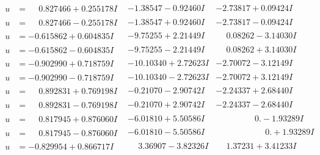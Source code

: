 \documentclass[1p]{elsarticle_modified}
\theoremstyle{definition}
\begin{document}
$$\begin{array}{c|c|c}
\begin{aligned}
u &= \phantom{-}0.827466 + 0.255178 I\end{aligned}
 & -1.38547 - 0.92460 I & -2.73817 + 0.09424 I \\ \hline\begin{aligned}
u &= \phantom{-}0.827466 - 0.255178 I\end{aligned}
 & -1.38547 + 0.92460 I & -2.73817 - 0.09424 I \\ \hline\begin{aligned}
u &= -0.615862 + 0.604835 I\end{aligned}
 & -9.75255 + 2.21449 I & \phantom{-}0.08262 - 3.14030 I \\ \hline\begin{aligned}
u &= -0.615862 - 0.604835 I\end{aligned}
 & -9.75255 - 2.21449 I & \phantom{-}0.08262 + 3.14030 I \\ \hline\begin{aligned}
u &= -0.902990 + 0.718759 I\end{aligned}
 & -10.10340 + 2.72623 I & -2.70072 - 3.12149 I \\ \hline\begin{aligned}
u &= -0.902990 - 0.718759 I\end{aligned}
 & -10.10340 - 2.72623 I & -2.70072 + 3.12149 I \\ \hline\begin{aligned}
u &= \phantom{-}0.892831 + 0.769198 I\end{aligned}
 & -0.21070 - 2.90742 I & -2.24337 + 2.68440 I \\ \hline\begin{aligned}
u &= \phantom{-}0.892831 - 0.769198 I\end{aligned}
 & -0.21070 + 2.90742 I & -2.24337 - 2.68440 I \\ \hline\begin{aligned}
u &= \phantom{-}0.817945 + 0.876060 I\end{aligned}
 & -6.01810 + 5.50586 I & \phantom{-0.000000 } 0. - 1.93289 I \\ \hline\begin{aligned}
u &= \phantom{-}0.817945 - 0.876060 I\end{aligned}
 & -6.01810 - 5.50586 I & \phantom{-0.000000 -}0. + 1.93289 I \\ \hline\begin{aligned}
u &= -0.829954 + 0.866717 I\end{aligned}
 & \phantom{-}3.36907 - 3.82326 I & \phantom{-}1.37231 + 3.41233 I \\ \hline\begin{aligned}

\end{aligned}
\end{array}$$
\end{document}
